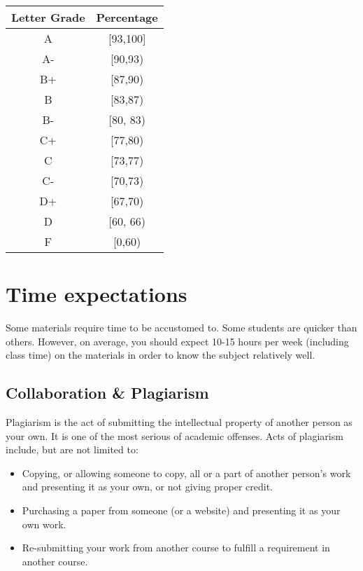 \documentclass[
  openany]{book}
\begin{document}
\begin{longtable}[]{@{}cc@{}}
\toprule\noalign{}
\textbf{Letter Grade} & \textbf{Percentage} \\
\midrule\noalign{}
\endhead
\bottomrule\noalign{}
\endlastfoot
A & {[}93,100{]} \\
A- & {[}90,93) \\
B+ & {[}87,90) \\
B & {[}83,87) \\
B- & {[}80, 83) \\
C+ & {[}77,80) \\
C & {[}73,77) \\
C- & {[}70,73) \\
D+ & {[}67,70) \\
D & {[}60, 66) \\
F & {[}0,60) \\
\end{longtable}

\section*{Time expectations}\label{time-expectations}

Some materials require time to be accustomed to. Some students are quicker than
others. However, on average, you should expect 10-15 hours per week (including class time)
on the materials in order to know the subject relatively well.

\subsection*{Collaboration \& Plagiarism}\label{collaboration-plagiarism}

Plagiarism is the act of submitting the intellectual property of another person as your own. It is one of the most serious of academic offenses. Acts of plagiarism include, but are not limited to:

\begin{itemize}
\item
  Copying, or allowing someone to copy, all or a part of another person's work and presenting it as your own, or not giving proper credit.
\item
  Purchasing a paper from someone (or a website) and presenting it as your own work.
\item
  Re-submitting your work from another course to fulfill a requirement in another course.
\end{itemize}
\end{document}
